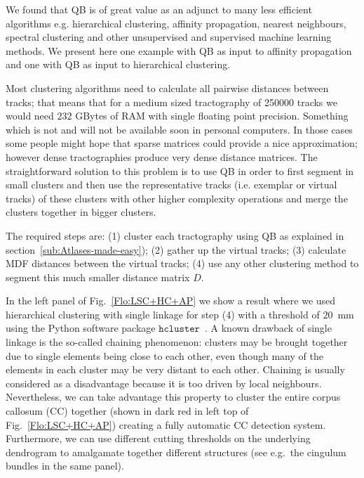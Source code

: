 \documentclass[journal]{IEEEtran}
\begin{document}
We found that QB is of great value as an adjunct to many less efficient
algorithms e.g. hierarchical clustering, affinity propagation, nearest
neighbours, spectral clustering and other unsupervised and supervised
machine learning methods. We present here one example with QB as input to
affinity propagation and one with QB as input to hierarchical
clustering.

Most clustering algorithms need to calculate all pairwise distances
between tracks; that means that for a medium sized tractography of
\num{250000} tracks we would need $232$ GBytes of RAM with single floating
point precision. Something which is not and will not be available soon
in personal computers. In those cases some people might hope that sparse
matrices could provide a nice approximation; however dense
tractographies produce very dense distance matrices. The straightforward
solution to this problem is to use QB in order to first segment in small
clusters and then use the representative tracks (i.e. exemplar or virtual
tracks) of these clusters with other higher complexity operations and merge the
clusters together in bigger clusters.

The required steps are: (1) cluster each tractography using QB as
explained in section~\ref{sub:Atlases-made-easy}); (2) gather up the
virtual tracks; (3) calculate MDF distances between the virtual tracks;
(4) use any other clustering method to segment this much smaller
distance matrix $D$.

In the left panel of Fig.~\ref{Flo:LSC+HC+AP} we show a result where we
used hierarchical clustering with single linkage for step (4) with a
threshold of $20$~mm using the Python software package
$\texttt{hcluster}$~\cite{eads-hcluster-software}. A known drawback of
single linkage is the so-called chaining phenomenon: clusters may be
brought together due to single elements being close to each other, even
though many of the elements in each cluster may be very distant to each
other. Chaining is usually considered as a disadvantage because it is
too driven by local neighbours. Nevertheless, we can take advantage this
property to cluster the entire corpus callosum (CC) together (shown in
dark red in left top of Fig.~\ref{Flo:LSC+HC+AP}) creating a fully
automatic CC detection system.  Furthermore, we can use different
cutting thresholds on the underlying dendrogram to amalgamate together
different structures (see e.g.~the cingulum bundles in the same panel).
\end{document}
